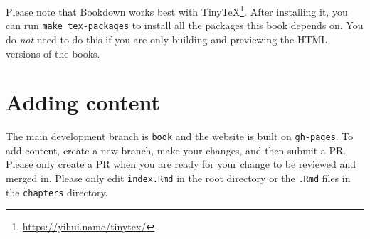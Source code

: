 \documentclass[
]{krantz}
\renewcommand{\href}[2]{#2\footnote{\url{#1}}}
\begin{document}
Please note that Bookdown works best with \href{https://yihui.name/tinytex/}{TinyTeX}.
After installing it, you can run \texttt{make\ tex-packages} to install all the packages this book depends on.
You do \emph{not} need to do this if you are only building and previewing the HTML versions of the books.

\hypertarget{adding-content}{%
\section*{Adding content}\label{adding-content}}


The main development branch is \texttt{book} and the website is built on \texttt{gh-pages}.
To add content, create a new branch, make your changes, and then submit a PR.
Please only create a PR when you are ready for your change to be reviewed and merged in.
Please only edit \texttt{index.Rmd} in the root directory or the \texttt{.Rmd} files in the \texttt{chapters} directory.
\end{document}
